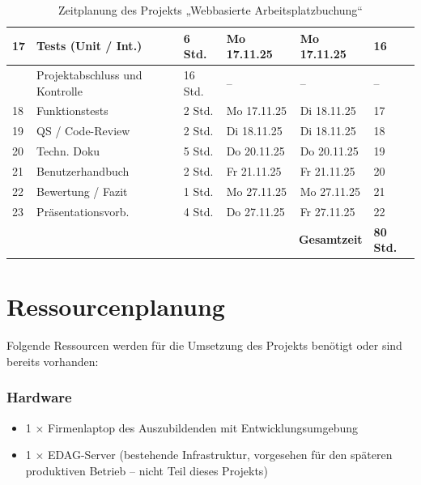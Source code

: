 \documentclass[11pt,a4paper]{report}
\begin{document}
\begin{table}[h!]
\begin{tabular}{|p{0.5cm}|p{5.5cm}|p{1.6cm}|p{2.2cm}|p{2.2cm}|p{2cm}|}
17 & Tests (Unit / Int.) & 6 Std. & Mo 17.11.25 & Mo 17.11.25 & 16 \\
\hline
 & Projektabschluss und Kontrolle & 16 Std. & -- & -- & -- \\
18 & Funktionstests & 2 Std. & Mo 17.11.25 & Di 18.11.25 & 17 \\
19 & QS / Code-Review & 2 Std. & Di 18.11.25 & Di 18.11.25 & 18 \\
20 & Techn. Doku & 5 Std. & Do 20.11.25 & Do 20.11.25 & 19 \\
21 & Benutzerhandbuch & 2 Std. & Fr 21.11.25 & Fr 21.11.25 & 20 \\
22 & Bewertung / Fazit & 1 Std. & Mo 27.11.25 & Mo 27.11.25 & 21 \\
23 & Präsentationsvorb. & 4 Std. & Do 27.11.25 & Fr 27.11.25 & 22 \\
\hline
\multicolumn{5}{|r|}{\textbf{Gesamtzeit}} & \textbf{80 Std.} \\
\hline
\end{tabular}
\caption{Zeitplanung des Projekts „Webbasierte Arbeitsplatzbuchung“}
\end{table}

\section{Ressourcenplanung}

Folgende Ressourcen werden für die Umsetzung des Projekts benötigt oder sind bereits vorhanden:

\subsubsection{Hardware}
\begin{itemize}
  \item 1 × Firmenlaptop des Auszubildenden mit Entwicklungsumgebung
  \item 1 × EDAG-Server (bestehende Infrastruktur, vorgesehen für den späteren produktiven Betrieb -- nicht Teil dieses Projekts)
\end{itemize}
\end{document}
